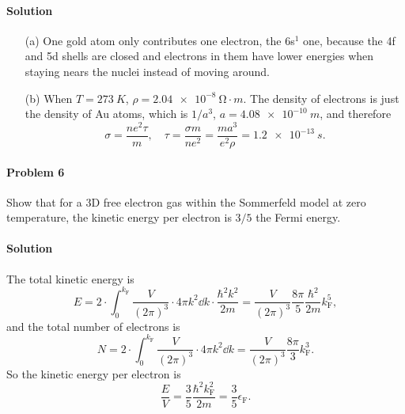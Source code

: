 \documentclass[hyperref, a4paper]{article}
\begin{document}
\paragraph{Solution} \begin{itemize}
\item[(a)] One gold atom only contributes one electron, the 6s$^1$ one,
because the 4f and 5d shells are closed and electrons in them have lower energies 
when staying nears the nuclei instead of moving around.
\item[(b)] When $T = \SI{273}{K}$, $\rho = \SI{2.04e-8}{\ohm \cdot m}$.
The density of electrons is just the density of Au atoms, which is $1 / a^3$,
$a = \SI{4.08e-10}{m}$,
and therefore 
\begin{equation}
    \sigma = \frac{n e^2 \tau}{m}, \quad 
    \tau = \frac{\sigma m}{n e^2} = \frac{m a^3}{e^2 \rho} = \SI{1.2e-13}{s}.
\end{equation}
\end{itemize}

\paragraph{Problem 6} Show that for a 3D free electron gas within the Sommerfeld model at zero temperature, the kinetic energy per electron is $3 / 5$ the Fermi energy.

\paragraph{Solution} The total kinetic energy is 
\begin{equation}
    E = 2 \cdot \int_{0}^{k_{\text{F}}} \frac{V}{(2\pi)^3} 
    \cdot 4\pi k^2 \dd{k} \cdot \frac{\hbar^2 k^2}{2m} 
    = \frac{V}{(2\pi)^3} \frac{8\pi}{5} \frac{\hbar^2}{2m} k_{\text{F}}^5,
\end{equation}
and the total number of electrons is 
\begin{equation}
    N = 2 \cdot \int_{0}^{k_{\text{F}}} \frac{V}{(2\pi)^3} \cdot 4\pi k^2 \dd{k}
    = \frac{V}{(2\pi)^3} \frac{8\pi}{3} k_{\text{F}}^3.
\end{equation}
So the kinetic energy per electron is 
\begin{equation}
    \frac{E}{V} = \frac{3}{5} \frac{\hbar^2 k_{\text{F}}^2}{2m} = \frac{3}{5} \epsilon_{\text{F}}.
\end{equation}
\end{document}
